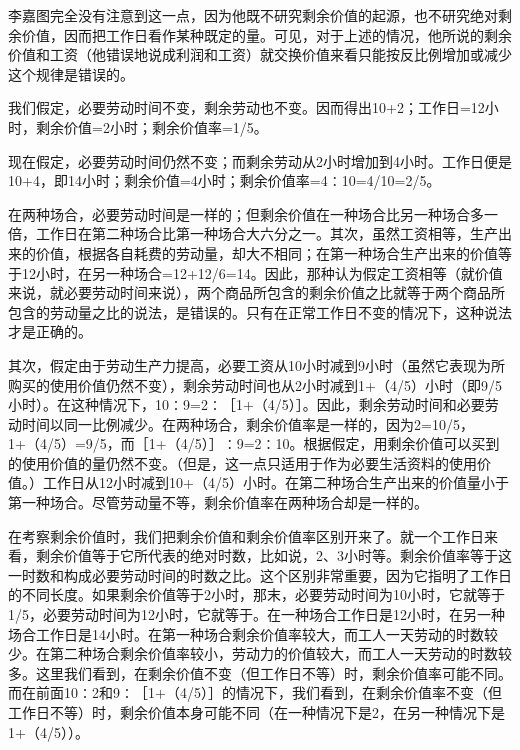 李嘉图完全没有注意到这一点，因为他既不研究剩余价值的起源，也不研究绝对剩余价值，因而把工作日看作某种既定的量。可见，对于上述的情况，他所说的剩余价值和工资（他错误地说成利润和工资）就交换价值来看只能按反比例增加或减少这个规律是错误的。

我们假定，必要劳动时间不变，剩余劳动也不变。因而得出10+2；工作日=12小时，剩余价值=2小时；剩余价值率=1/5。

现在假定，必要劳动时间仍然不变；而剩余劳动从2小时增加到4小时。工作日便是10+4，即14小时；剩余价值=4小时；剩余价值率=4∶10=4/10=2/5。

在两种场合，必要劳动时间是一样的；但剩余价值在一种场合比另一种场合多一倍，工作日在第二种场合比第一种场合大六分之一。其次，虽然工资相等，生产出来的价值，根据各自耗费的劳动量，却大不相同；在第一种场合生产出来的价值等于12小时，在另一种场合=12+12/6=14。因此，那种认为假定工资相等（就价值来说，就必要劳动时间来说），两个商品所包含的剩余价值之比就等于两个商品所包含的劳动量之比的说法，是错误的。只有在正常工作日不变的情况下，这种说法才是正确的。

其次，假定由于劳动生产力提高，必要工资从10小时减到9小时（虽然它表现为所购买的使用价值仍然不变），剩余劳动时间也从2小时减到1+（4/5）小时（即9/5小时）。在这种情况下，10∶9=2∶［1+（4/5）］。因此，剩余劳动时间和必要劳动时间以同一比例减少。在两种场合，剩余价值率是一样的，因为2=10/5，1+（4/5）=9/5，而［1+（4/5）］∶9=2∶10。根据假定，用剩余价值可以买到的使用价值的量仍然不变。（但是，这一点只适用于作为必要生活资料的使用价值。）工作日从12小时减到10+（4/5）小时。在第二种场合生产出来的价值量小于第一种场合。尽管劳动量不等，剩余价值率在两种场合却是一样的。

在考察剩余价值时，我们把剩余价值和剩余价值率区别开来了。就一个工作日来看，剩余价值等于它所代表的绝对时数，比如说，2、3小时等。剩余价值率等于这一时数和构成必要劳动时间的时数之比。这个区别非常重要，因为它指明了工作日的不同长度。如果剩余价值等于2小时，那末，必要劳动时间为10小时，它就等于1/5，必要劳动时间为12小时，它就等于。在一种场合工作日是12小时，在另一种场合工作日是14小时。在第一种场合剩余价值率较大，而工人一天劳动的时数较少。在第二种场合剩余价值率较小，劳动力的价值较大，而工人一天劳动的时数较多。这里我们看到，在剩余价值不变（但工作日不等）时，剩余价值率可能不同。而在前面10∶2和9∶［1+（4/5）］的情况下，我们看到，在剩余价值率不变（但工作日不等）时，剩余价值本身可能不同（在一种情况下是2，在另一种情况下是1+（4/5））。


